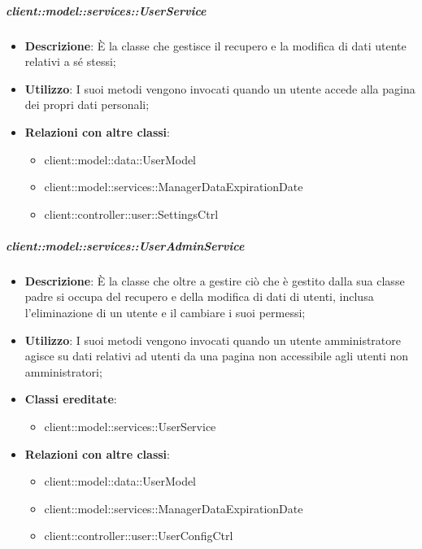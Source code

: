 		\subparagraph{client::model::services::UserService} %
		\label{subp:client_model_services_userservice}
			\begin{itemize}
				\item \textbf{Descrizione}: È la classe che gestisce il recupero e la modifica di dati utente relativi a sé stessi;
				\item \textbf{Utilizzo}: I suoi metodi vengono invocati quando un utente accede alla pagina dei propri dati personali;
				\item \textbf{Relazioni con altre classi}:
					\begin{itemize}
						\item client::model::data::UserModel
						\item client::model::services::ManagerDataExpirationDate
						\item client::controller::user::SettingsCtrl
					\end{itemize}
			\end{itemize}

		\subparagraph{client::model::services::UserAdminService} %
		\label{subp:client_model_services_useradminservice}
			\begin{itemize}
				\item \textbf{Descrizione}: È la classe che oltre a gestire ciò che è gestito dalla sua classe padre si occupa del recupero e della modifica di dati di utenti, inclusa l'eliminazione di un utente e il cambiare i suoi permessi;
				\item \textbf{Utilizzo}: I suoi metodi vengono invocati quando un utente amministratore agisce su dati relativi ad utenti da una pagina non accessibile agli utenti non amministratori;
				\item \textbf{Classi ereditate}:					
					\begin{itemize}
						\item client::model::services::UserService
					\end{itemize}
				\item \textbf{Relazioni con altre classi}:
					\begin{itemize}
						\item client::model::data::UserModel
						\item client::model::services::ManagerDataExpirationDate
						\item client::controller::user::UserConfigCtrl
					\end{itemize}
				\end{itemize}

